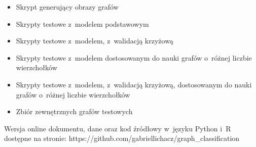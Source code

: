 
\begin{itemize}[label=-,labelsep=0.4cm,leftmargin=0.6cm]
    \item Skrypt generujący obrazy grafów
    \item Skrypty testowe z~modelem podstawowym
    \item Skrypty testowe z~modelem, z~walidacją krzyżową
    \item Skrypty testowe z~modelem dostosowanym do nauki grafów o~różnej liczbie wierzchołków
    \item Skrypty testowe z~modelem, z~walidacją krzyżową, dostosowanym do nauki grafów o~różnej liczbie wierzchołków
    \item Zbiór zewnętrznych grafów testowych
\end{itemize}

\vspace*{\fill}

Wersja online dokumentu, dane oraz kod źródłowy w~języku Python i~R dostępne na stronie:
https://github.com/gabriellichacz/graph\_classification